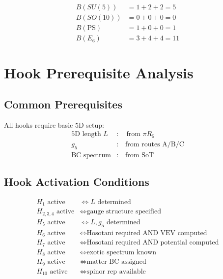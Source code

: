 \documentclass[11pt,a4paper]{article}
\begin{document}
\begin{align}
\label{eq:burden-su5-total}
B(SU(5)) &= 1 + 2 + 2 = 5 \\
\label{eq:burden-so10-total}
B(SO(10)) &= 0 + 0 + 0 = 0 \\
\label{eq:burden-ps-total}
B(\text{PS}) &= 1 + 0 + 0 = 1 \\
\label{eq:burden-e6-total}
B(E_6) &= 3 + 4 + 4 = 11
\end{align}

\section{Hook Prerequisite Analysis}
\label{app:hook-prereq}

\subsection{Common Prerequisites}
\label{app:common-prereq}

All hooks require basic 5D setup:
\begin{align}
\label{eq:prereq-L}
\text{5D length } L &: \quad \text{from } \pi R_5 \\
\label{eq:prereq-g5}
g_5 &: \quad \text{from routes A/B/C} \\
\label{eq:prereq-BC}
\text{BC spectrum} &: \quad \text{from SoT}
\end{align}

\subsection{Hook Activation Conditions}
\label{app:hook-activation}

\begin{align}
\label{eq:hook-act-1}
H_1 \text{ active} &\iff L \text{ determined} \\
\label{eq:hook-act-2}
H_{2,3,4} \text{ active} &\iff \text{gauge structure specified} \\
\label{eq:hook-act-5}
H_5 \text{ active} &\iff L, g_5 \text{ determined} \\
\label{eq:hook-act-6}
H_6 \text{ active} &\iff \text{Hosotani required AND VEV computed} \\
\label{eq:hook-act-7}
H_7 \text{ active} &\iff \text{Hosotani required AND potential computed} \\
\label{eq:hook-act-8}
H_8 \text{ active} &\iff \text{exotic spectrum known} \\
\label{eq:hook-act-9}
H_9 \text{ active} &\iff \text{matter BC assigned} \\
\label{eq:hook-act-10}
H_{10} \text{ active} &\iff \text{spinor rep available}
\end{align}
\end{document}
